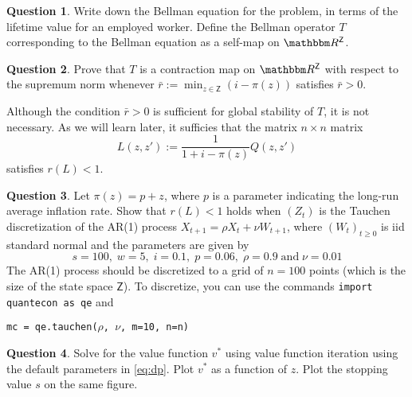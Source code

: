 \documentclass[12pt]{article}
\newcommand{\1}{\mathbbm 1}
\newcommand{\RR}{\mathbbm R}
\newcommand{\Zsf}{\mathsf Z}
\theoremstyle{definition}
\newtheorem{question}{Question}
\begin{document}
\begin{question}
    Write down the Bellman equation for the problem, in terms of the lifetime
    value for an employed worker.  Define the Bellman operator $T$
    corresponding to the Bellman equation as a self-map on $\RR^\Zsf$. 
\end{question}

\begin{question}
    Prove that $T$ is a contraction map on $\RR^\Zsf$ with respect to the
    supremum norm whenever $\bar r := \min_{z \in \Zsf} (i - \pi(z))$
    satisfies $\bar r > 0$.
\end{question}

Although the condition $\bar r > 0$ is sufficient for global stability of $T$,
it is not necessary.  As we will learn later, it sufficies that the matrix
$n \times n$ matrix
%
\begin{equation*}
    L(z, z') := \frac{1}{1 + i - \pi(z)} Q(z, z')
\end{equation*}
%
satisfies $r(L) < 1$.  

\begin{question}
    Let $\pi(z) = p + z$, where $p$ is a parameter indicating the long-run
    average inflation rate.  Show that $r(L) < 1$ holds when $(Z_t)$ is
    the Tauchen discretization of the AR(1) process $X_{t+1} = \rho X_t + \nu
    W_{t+1}$, where $(W_t)_{t \geq 0}$ is {\sc iid} standard normal and
    the parameters are given by
    \begin{equation}\label{eq:dp}
        s = 100, \;
        w = 5,   \;
        i = 0.1,\;
        p = 0.06,\;
        \rho = 0.9 \; \text{and} \;
        \nu = 0.01
    \end{equation}
    The AR(1) process should be discretized to a grid of $n = 100$ points
    (which is the size of the state space $\Zsf$).  To discretize, 
    you can use the commands \texttt{import quantecon as qe} and
    \begin{center}
        \texttt{mc = qe.tauchen($\rho$, $\nu$, m=10, n=n)}
    \end{center}
\end{question}

\begin{question}
    Solve for the value function $v^*$ using value function iteration using
    the default parameters in \eqref{eq:dp}.  Plot $v^*$ as
    a function of $z$. Plot the stopping value $s$ on the same figure.    
\end{question}
\end{document}
